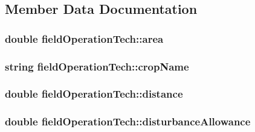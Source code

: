 \subsection{Member Data Documentation}
\hypertarget{classfield_operation_tech_a4577ac12831e5d317301920b7e26de69}{
\subsubsection[{area}]{\setlength{\rightskip}{0pt plus 5cm}double {\bf fieldOperationTech::area}}}
\label{classfield_operation_tech_a4577ac12831e5d317301920b7e26de69}
\hypertarget{classfield_operation_tech_ab89a76987f03b1e7ae02d7ecca19c944}{
\subsubsection[{cropName}]{\setlength{\rightskip}{0pt plus 5cm}string {\bf fieldOperationTech::cropName}}}
\label{classfield_operation_tech_ab89a76987f03b1e7ae02d7ecca19c944}
\hypertarget{classfield_operation_tech_a632ea22d4eb656dc9a2e44a2e5b0864c}{
\subsubsection[{distance}]{\setlength{\rightskip}{0pt plus 5cm}double {\bf fieldOperationTech::distance}}}
\label{classfield_operation_tech_a632ea22d4eb656dc9a2e44a2e5b0864c}
\hypertarget{classfield_operation_tech_a8d8b0c38c97ad38b9b3a595e4faf6a1f}{
\subsubsection[{disturbanceAllowance}]{\setlength{\rightskip}{0pt plus 5cm}double {\bf fieldOperationTech::disturbanceAllowance}}}

